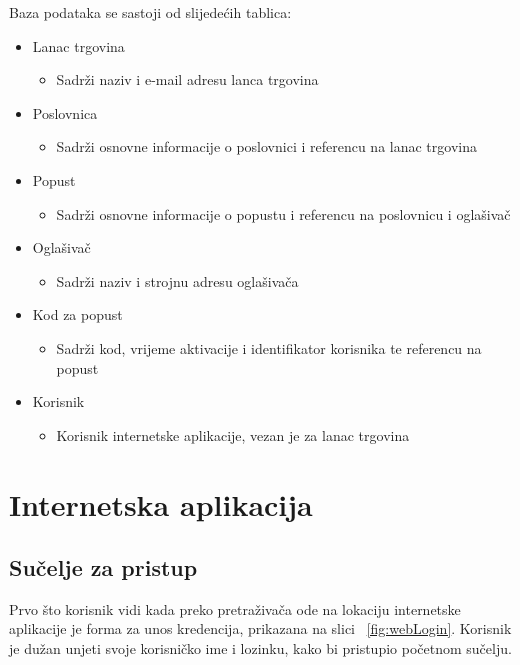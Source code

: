 Baza podataka se sastoji od slijede\'{c}ih tablica:
\begin{itemize}
	\item Lanac trgovina
	\begin{itemize}
		\item Sadr\v{z}i naziv i e-mail adresu lanca trgovina
	\end{itemize}
	\item Poslovnica
	\begin{itemize}
		\item Sadr\v{z}i osnovne informacije o poslovnici i referencu na lanac trgovina
	\end{itemize}
	\item Popust
	\begin{itemize}
		\item Sadr\v{z}i osnovne informacije o popustu i referencu na poslovnicu i ogla\v{s}iva\v{c}
	\end{itemize}
	\item Ogla\v{s}iva\v{c}
	\begin{itemize}
		\item Sadr\v{z}i naziv i strojnu adresu ogla\v{s}iva\v{c}a
	\end{itemize}
	\item Kod za popust
	\begin{itemize}
		\item Sadr\v{z}i kod, vrijeme aktivacije i identifikator korisnika te referencu na popust
	\end{itemize}
	\item Korisnik
	\begin{itemize}
		\item Korisnik internetske aplikacije, vezan je za lanac trgovina
	\end{itemize}
\end{itemize}



\section{Internetska aplikacija}

\subsection{Su\v{c}elje za pristup}

Prvo \v{s}to korisnik vidi kada preko pretra\v{z}iva\v{c}a ode na lokaciju internetske aplikacije je forma za unos kredencija, prikazana na slici ~\ref{fig:webLogin}. Korisnik je du\v{z}an unjeti svoje korisni\v{c}ko ime i lozinku, kako bi pristupio po\v{c}etnom su\v{c}elju.

